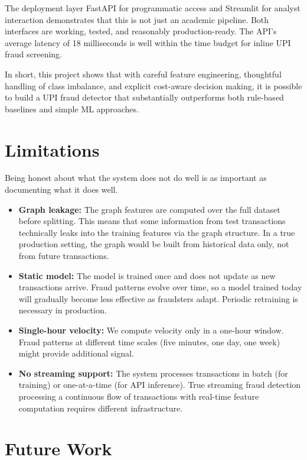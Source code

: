 The deployment layer FastAPI for programmatic access and Streamlit for analyst interaction demonstrates that this is not just an academic pipeline. Both interfaces are working, tested, and reasonably production-ready. The API's average latency of 18 milliseconds is well within the time budget for inline UPI fraud screening.

In short, this project shows that with careful feature engineering, thoughtful handling of class imbalance, and explicit cost-aware decision making, it is possible to build a UPI fraud detector that substantially outperforms both rule-based baselines and simple ML approaches.

\section{Limitations}

Being honest about what the system does not do well is as important as documenting what it does well.

\begin{itemize}
    \item \textbf{Graph leakage:} The graph features are computed over the full dataset before splitting. This means that some information from test transactions technically leaks into the training features via the graph structure. In a true production setting, the graph would be built from historical data only, not from future transactions.

    \item \textbf{Static model:} The model is trained once and does not update as new transactions arrive. Fraud patterns evolve over time, so a model trained today will gradually become less effective as fraudsters adapt. Periodic retraining is necessary in production.


    \item \textbf{Single-hour velocity:} We compute velocity only in a one-hour window. Fraud patterns at different time scales (five minutes, one day, one week) might provide additional signal.

    \item \textbf{No streaming support:} The system processes transactions in batch (for training) or one-at-a-time (for API inference). True streaming fraud detection processing a continuous flow of transactions with real-time feature computation requires different infrastructure.
\end{itemize}

\section{Future Work}

